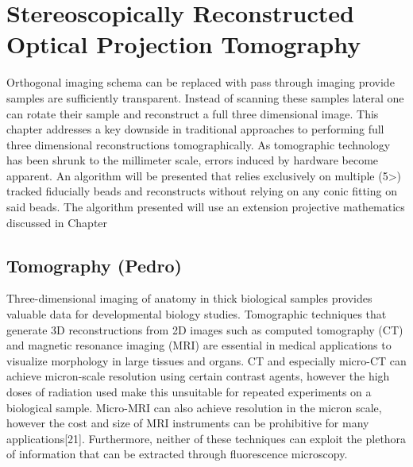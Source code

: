 \ifpdf
    \graphicspath{{Chapters/flopt/Figs/Raster/}{Chapters/flopt/Figs/PDF/}{Chapters/flopt/Figs/}}
\else
    \graphicspath{{Chapters/flopt/Figs/Vector/}{Chapters/flopt/Figs/}}
\fi

\chapter{Stereoscopically Reconstructed Optical Projection Tomography}

Orthogonal imaging schema can be replaced with pass through imaging provide samples are sufficiently transparent.
Instead of scanning these samples lateral one can rotate their sample and reconstruct a full three dimensional image.
This chapter addresses a key downside in traditional approaches to performing full three dimensional reconstructions tomographically.
As tomographic technology has been shrunk to the millimeter scale, errors induced by hardware become apparent.
An algorithm will be presented that relies exclusively on multiple (5>) tracked fiducially beads and reconstructs without relying on any conic fitting on said beads.
The algorithm presented will use an extension projective mathematics discussed in Chapter %


\section{Tomography (Pedro)}
Three-dimensional imaging of anatomy in thick biological samples provides valuable data for developmental biology studies.
Tomographic techniques that generate 3D reconstructions from 2D images such as computed tomography (CT) and magnetic resonance imaging (MRI) are essential in medical applications to visualize morphology in large tissues and organs.
CT and especially micro-CT can achieve micron-scale resolution using certain contrast agents, however the high doses of radiation used make this unsuitable for repeated experiments on a biological sample.
Micro-MRI can also achieve resolution in the micron scale, however the cost and size of MRI instruments can be prohibitive for many applications[21].
Furthermore, neither of these techniques can exploit the plethora of information that can be extracted through fluorescence microscopy.

